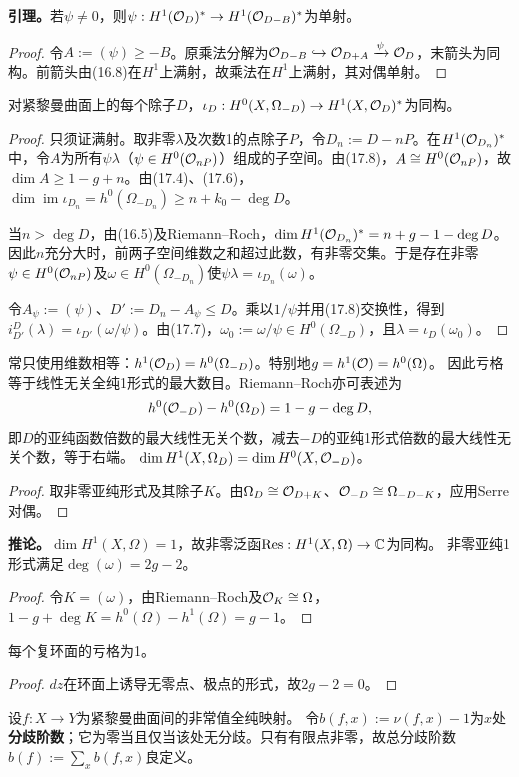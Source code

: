 \textbf{引理。}若$\psi\ne0$，则$\psi:H^1(\mathcal O_D)^*\to H^1(\mathcal O_{D-B})^*$为单射。
\begin{proof}
令$A:=(\psi)\ge-B$。原乘法分解为$\mathcal O_{D-B}\hookrightarrow\mathcal O_{D+A}\xrightarrow\psi\mathcal O_D$，末箭头为同构。前箭头由(16.8)在$H^1$上满射，故乘法在$H^1$上满射，其对偶单射。
\end{proof}
对紧黎曼曲面上的每个除子$D$，$\iota_D:H^0(X,\Omega_{-D})\to H^1(X,\mathcal O_D)^*$为同构。
\begin{proof}
只须证满射。取非零$\lambda$及次数1的点除子$P$，令$D_n:=D-nP$。在$H^1(\mathcal O_{D_n})^*$中，令$A$为所有$\psi\lambda$（$\psi\in H^0(\mathcal O_{nP})$）组成的子空间。由(17.8)，$A\cong H^0(\mathcal O_{nP})$，故$\dim A\ge1-g+n$。由(17.4)、(17.6)，$\dim\operatorname{im}\iota_{D_n}=h^0(\Omega_{-D_n})\ge n+k_0-\deg D$。

当$n>\deg D$，由(16.5)及Riemann--Roch，$\dim H^1(\mathcal O_{D_n})^*=n+g-1-\deg D$。因此$n$充分大时，前两子空间维数之和超过此数，有非零交集。于是存在非零$\psi\in H^0(\mathcal O_{nP})$及$\omega\in H^0(\Omega_{-D_n})$使$\psi\lambda=\iota_{D_n}(\omega)$。

令$A_\psi:=(\psi)$、$D':=D_n-A_\psi\le D$。乘以$1/\psi$并用(17.8)交换性，得到$i_{D'}^D(\lambda)=\iota_{D'}(\omega/\psi)$。由(17.7)，$\omega_0:=\omega/\psi\in H^0(\Omega_{-D})$，且$\lambda=\iota_D(\omega_0)$。
\end{proof}
常只使用维数相等：$h^1(\mathcal O_D)=h^0(\Omega_{-D})$。特别地$g=h^1(\mathcal O)=h^0(\Omega)$。
因此亏格等于线性无关全纯1形式的最大数目。Riemann--Roch亦可表述为
\[
h^0(\mathcal O_{-D})-h^0(\Omega_D)=1-g-\deg D,
\]
即$D$的亚纯函数倍数的最大线性无关个数，减去$-D$的亚纯1形式倍数的最大线性无关个数，等于右端。
$\dim H^1(X,\Omega_D)=\dim H^0(X,\mathcal O_{-D})$。
\begin{proof}
取非零亚纯形式及其除子$K$。由$\Omega_D\cong\mathcal O_{D+K}$、$\mathcal O_{-D}\cong\Omega_{-D-K}$，应用Serre对偶。
\end{proof}
\textbf{推论。}$\dim H^1(X,\Omega)=1$，故非零泛函$\operatorname{Res}:H^1(X,\Omega)\to\mathbb C$为同构。
非零亚纯1形式满足$\deg(\omega)=2g-2$。
\begin{proof}
令$K=(\omega)$，由Riemann--Roch及$\mathcal O_K\cong\Omega$，$1-g+\deg K=h^0(\Omega)-h^1(\Omega)=g-1$。
\end{proof}
每个复环面的亏格为1。
\begin{proof}$dz$在环面上诱导无零点、极点的形式，故$2g-2=0$。\end{proof}
设$f:X\to Y$为紧黎曼曲面间的非常值全纯映射。
令$b(f,x):=\nu(f,x)-1$为$x$处\textbf{分歧阶数}；它为零当且仅当该处无分歧。只有有限点非零，故总分歧阶数$b(f):=\sum_xb(f,x)$良定义。

